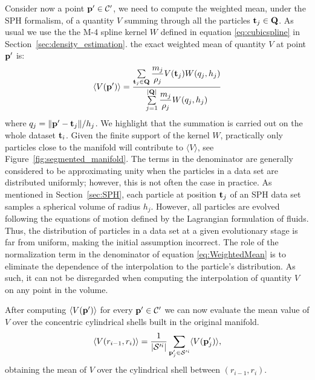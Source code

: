 Consider now a point $\boldsymbol{\mathbf{p}}' \in \mathcal{C}'$, we need to compute the weighted mean, under the SPH formalism, of a quantity $V$ summing through all the particles $\boldsymbol{\mathbf{t}}_j \in \boldsymbol{\mathbf{Q}}$.
As usual we use the the M-4 spline kernel $W$ defined in equation \eqref{eq:cubicspline} in Section~\ref{sec:density_estimation}.
the exact weighted mean of quantity $V$ at point $\boldsymbol{\mathbf{p}}'$ is:
\begin{equation}\label{eq:WeightedMean}
  \langle V(\boldsymbol{\mathbf{p}}') \rangle = \dfrac{\sum\limits_{\boldsymbol{\mathbf{t}}_j \in \boldsymbol{\mathbf{Q}}} \dfrac{m_j}{\rho_j} V(\boldsymbol{\mathbf{t}}_j) W(q_j,h_j)}{\sum\limits_{j=1}^{|\boldsymbol{\mathbf{Q}}|} \dfrac{m_j}{\rho_j} W(q_j,h_j)}
\end{equation}
where $q_j = \norm{\boldsymbol{\mathbf{p}}' - \boldsymbol{\mathbf{t}}_j}/h_j$.
We highlight that the summation is carried out on the whole dataset $\boldsymbol{\mathbf{t}}_i$.
Given the finite support of the kernel $W$, practically only particles close to the manifold will contribute to $\langle V \rangle$, see Figure~\ref{fig:segmented_manifold}.
The terms in the denominator are generally considered to be approximating unity when the particles in a data set are distributed uniformly; however, this is not often the case in practice.
As mentioned in Section~\ref{sec:SPH}, each particle at position $\boldsymbol{\mathbf{t}}_j$ of an SPH data set samples a spherical volume of radius $h_j$.
However, all particles are evolved following the equations of motion defined by the Lagrangian formulation of fluids.
Thus, the distribution of particles in a data set at a given evolutionary stage is far from uniform, making the initial assumption incorrect.
The role of the normalization term
in the denominator of equation \ref{eq:WeightedMean} is to eliminate the dependence of the interpolation to the particle's distribution.
As such, it can not be disregarded when computing the interpolation of quantity $V$ on any point in the volume.

After computing $\langle V(\boldsymbol{\mathbf{p}}')\rangle$ for every $\boldsymbol{\mathbf{p}}' \in \mathcal{C}'$ we can now evaluate the mean value of $V$ over the concentric cylindrical shells built in the original manifold.%
\begin{equation}
  \langle V(r_{i-1},r_i)\rangle = \frac{1}{|\mathcal{S}'^i|} \sum_{\boldsymbol{\mathbf{p}}'_j \in \mathcal{S}'^i} \langle V(\boldsymbol{\mathbf{p}}'_j)\rangle,
\end{equation}
obtaining the mean of $V$ over the cylindrical shell between $(r_{i-1},r_i)$.

